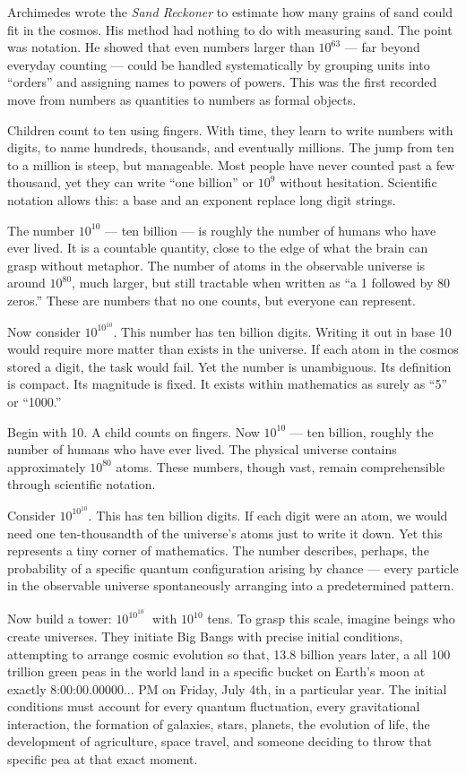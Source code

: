 Archimedes wrote the \emph{Sand Reckoner} to estimate how many grains of sand could fit in the cosmos. His method had nothing to do with measuring sand. The point was notation. He showed that even numbers larger than $10^{63}$ — far beyond everyday counting — could be handled systematically by grouping units into “orders” and assigning names to powers of powers. This was the first recorded move from numbers as quantities to numbers as formal objects.

Children count to ten using fingers. With time, they learn to write numbers with digits, to name hundreds, thousands, and eventually millions. The jump from ten to a million is steep, but manageable. Most people have never counted past a few thousand, yet they can write “one billion” or $10^9$ without hesitation. Scientific notation allows this: a base and an exponent replace long digit strings.

The number $10^{10}$ — ten billion — is roughly the number of humans who have ever lived. It is a countable quantity, close to the edge of what the brain can grasp without metaphor. The number of atoms in the observable universe is around $10^{80}$, much larger, but still tractable when written as “a 1 followed by 80 zeros.” These are numbers that no one counts, but everyone can represent.

Now consider $10^{10^{10}}$. This number has ten billion digits. Writing it out in base 10 would require more matter than exists in the universe. If each atom in the cosmos stored a digit, the task would fail. Yet the number is unambiguous. Its definition is compact. Its magnitude is fixed. It exists within mathematics as surely as “5” or “1000.”

Begin with 10. A child counts on fingers. Now $10^{10}$ — ten billion, roughly the number of humans who have ever lived. The physical universe contains approximately $10^{80}$ atoms. These numbers, though vast, remain comprehensible through scientific notation.

Consider $10^{10^{10}}$. This has ten billion digits. If each digit were an atom, we would need one ten-thousandth of the universe's atoms just to write it down. Yet this represents a tiny corner of mathematics. The number describes, perhaps, the probability of a specific quantum configuration arising by chance — every particle in the observable universe spontaneously arranging into a predetermined pattern.

Now build a tower: $10^{10^{10^{\cdot^{\cdot^{\cdot}}}}}$ with $10^{10}$ tens. To grasp this scale, imagine beings who create universes. They initiate Big Bangs with precise initial conditions, attempting to arrange cosmic evolution so that, 13.8 billion years later, a all 100 trillion green peas in the world land in a specific bucket on Earth's moon at exactly 8:00:00.00000... PM on Friday, July 4th, in a particular year. The initial conditions must account for every quantum fluctuation, every gravitational interaction, the formation of galaxies, stars, planets, the evolution of life, the development of agriculture, space travel, and someone deciding to throw that specific pea at that exact moment. 

